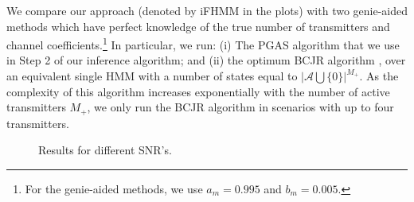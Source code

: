 \documentclass[a4paper]{article}
\def\Acal{\mathcal{A}}
\begin{document}
We compare our approach (denoted by iFHMM in the plots) with two genie-aided methods which have perfect knowledge of the true number of transmitters and channel coefficients.\footnote{For the genie-aided methods, we use $a_m=0.995$ and $b_m=0.005$.} In particular, we run: (i) The PGAS algorithm that we use in Step 2 of our inference algorithm; and (ii) the optimum BCJR algorithm \cite{Bahl74}, over an equivalent single HMM with a number of states equal to $| \Acal \bigcup \{0\} |^{M_+}$. As the complexity of this algorithm increases exponentially with the number of active transmitters $M_+$, we only run the BCJR algorithm in scenarios with up to four transmitters.

%
\begin{figure}[th]
\centering
{}
\vspace*{-3mm}
\caption{Results for different SNR's.}\label{fig:resultsSNR}
\vspace*{-4mm}
\end{figure}
%
\end{document}
